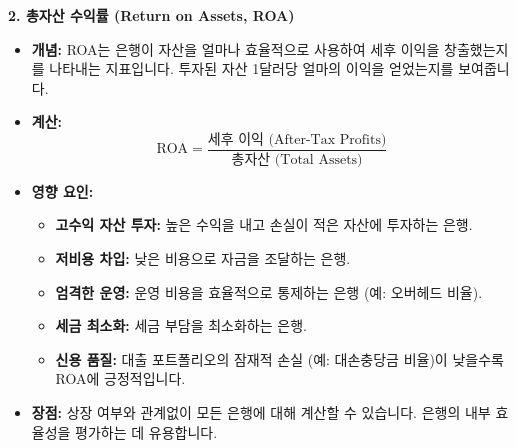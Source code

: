 \documentclass[11pt,a4paper]{article}
\theoremstyle{definition}
\begin{document}
\textbf{2. 총자산 수익률 (Return on Assets, ROA)}
\begin{itemize}
    \item \textbf{개념:} ROA는 은행이 자산을 얼마나 효율적으로 사용하여 세후 이익을 창출했는지를 나타내는 지표입니다. 투자된 자산 1달러당 얼마의 이익을 얻었는지를 보여줍니다.
    \item \textbf{계산:}
    \begin{equation*}
        \text{ROA} = \frac{\text{세후 이익 (After-Tax Profits)}}{\text{총자산 (Total Assets)}}
    \end{equation*}
    \item \textbf{영향 요인:}
        \begin{itemize}
            \item \textbf{고수익 자산 투자:} 높은 수익을 내고 손실이 적은 자산에 투자하는 은행.
            \item \textbf{저비용 차입:} 낮은 비용으로 자금을 조달하는 은행.
            \item \textbf{엄격한 운영:} 운영 비용을 효율적으로 통제하는 은행 (예: 오버헤드 비율).
            \item \textbf{세금 최소화:} 세금 부담을 최소화하는 은행.
            \item \textbf{신용 품질:} 대출 포트폴리오의 잠재적 손실 (예: 대손충당금 비율)이 낮을수록 ROA에 긍정적입니다.
        \end{itemize}
    \item \textbf{장점:} 상장 여부와 관계없이 모든 은행에 대해 계산할 수 있습니다. 은행의 내부 효율성을 평가하는 데 유용합니다.
\end{itemize}
\end{document}

